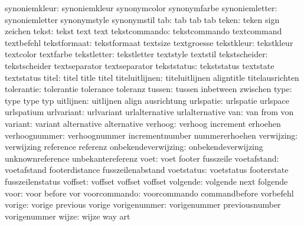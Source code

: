        synoniemkleur:  synoniemkleur        synonymcolor         synonymfarbe
      synoniemletter:  synoniemletter       synonymstyle         synonymstil
                 tab:  tab                  tab                  tab
               teken:  teken                sign                 zeichen
               tekst:  tekst                text                 text
       tekstcommando:  tekstcommando        textcommand          textbefehl
        tekstformaat:  tekstformaat         textsize             textgroesse
          tekstkleur:  tekstkleur           textcolor            textfarbe
         tekstletter:  tekstletter          textstyle            textstil
       tekstscheider:  tekstscheider        textseparator        textseparator
         tekststatus:  tekststatus          textstate            textstatus
               titel:  titel                title                titel
      titeluitlijnen:  titeluitlijnen       aligntitle           titelausrichten
          tolerantie:  tolerantie           tolerance            toleranz
              tussen:  tussen               inbetween            zwischen
                type:  type                 type                 typ
           uitlijnen:  uitlijnen            align                ausrichtung
           urlspatie:  urlspatie            urlspace             urlspatium
          urlvariant:  urlvariant           urlalternative       urlalternative
                 van:  van                  from                 von
             variant:  variant              alternative          alternative
             verhoog:  verhoog              increment            erhoehen
       verhoognummer:  verhoognummer        incrementnumber      nummererhoehen
          verwijzing:  verwijzing           reference            referenz
 onbekendeverwijzing:  onbekendeverwijzing  unknownreference     unbekantereferenz
                voet:  voet                 footer               fusszeile
         voetafstand:  voetafstand          footerdistance       fusszeilenabstand
          voetstatus:  voetstatus           footerstate          fusszeilenstatus
             voffset:  voffset              voffset              voffset
            volgende:  volgende             next                 folgende
                voor:  voor                 before               vor
        voorcommando:  voorcommando         commandbefore        vorbefehl
              vorige:  vorige               previous             vorige
        vorigenummer:  vorigenummer         previousnumber       vorigenummer
               wijze:  wijze                way                  art
